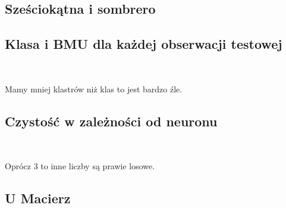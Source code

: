 \documentclass[11pt]{article}
\begin{document}
    \hypertarget{szeux15bciokux105tna-i-sombrero}{%
\subsection{Sześciokątna i
sombrero}\label{szeux15bciokux105tna-i-sombrero}}

    \hypertarget{klasa-i-bmu-dla-kaux17cdej-obserwacji-testowej}{%
\subsection{Klasa i BMU dla każdej obserwacji
testowej}\label{klasa-i-bmu-dla-kaux17cdej-obserwacji-testowej}}

           
        
    \begin{center}
    \end{center}
    { \hspace*{\fill} \\}
    
    Mamy mniej klastrów niż klas to jest bardzo źle.

    \hypertarget{czystoux15bux107-w-zaleux17cnoux15bci-od-neuronu}{%
\subsection{Czystość w zależności od
neuronu}\label{czystoux15bux107-w-zaleux17cnoux15bci-od-neuronu}}

            
        
    \begin{center}
    \end{center}
    { \hspace*{\fill} \\}
    
    Oprócz 3 to inne liczby są prawie losowe.

    \hypertarget{u-macierz}{%
\subsection{U Macierz}\label{u-macierz}}

            
        
    \begin{center}
    \end{center}
    { \hspace*{\fill} \\}
    
\end{document}
